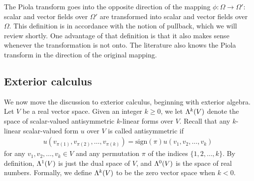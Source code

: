 \documentclass[10pt,a4paper]{article}
\newcommand\cye[1]{%
\protect\leavevmode
\begingroup
    \color{blue}%
    #1%
\endgroup
}
\newcommand{\mwl}[1]{{\color{red}#1}}
\begin{document}
\begin{remark}
    The Piola transform goes into the opposite direction of the mapping $\phi : \Omega \rightarrow \Omega'$:
    scalar and vector fields over $\Omega'$ are transformed into scalar and vector fields over $\Omega$.
    This definition is in accordance with the notion of pullback, which we will review shortly. 
    One advantage of that definition is that it also makes sense whenever the transformation is not onto. 
    The literature also knows the Piola transform in the direction of the original mapping. 
\end{remark}


\subsection{Exterior calculus}


\mwl{We now move the discussion to exterior calculus, beginning with exterior algebra.}
Let $V$ be a real vector space. 
Given an integer $k \geq 0$, we let $\Lambda^{k}(V)$ denote the space of scalar-valued antisymmetric $k$-linear forms over $V$. 
Recall that any $k$-linear scalar-valued form $u$ over $V$ is called antisymmetric
if 
\begin{gather*} 
    u( v_{\pi(1)}, v_{\pi(2)}, \ldots, v_{\pi(k)} ) 
    = 
    \text{sign}(\pi) 
    u( v_1, v_2, \ldots, v_k ) 
\end{gather*}
for any $v_1, v_2, \dots, v_k \in V$ and any permutation $\pi$ of the indices \(\{1, 2, \ldots, k\}\). 
By definition, $\Lambda^{1}(V)$ is just the dual space of $V$, and $\Lambda^{0}(V)$ is the space of real numbers. 
Formally, we define $\Lambda^{k}(V)$ to be the zero vector space when $k < 0$. 
\end{document}
